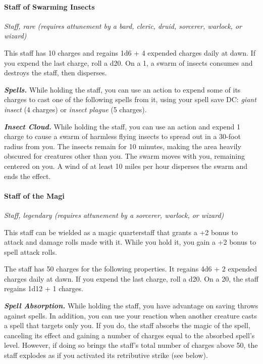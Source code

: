 \documentclass[
]{article}
\begin{document}
\hypertarget{staff-of-swarming-insects}{%
\paragraph{Staff of Swarming Insects}\label{staff-of-swarming-insects}}

\emph{Staff, rare (requires attunement by a bard, cleric, druid,
sorcerer, warlock, or wizard)}

This staff has 10 charges and regains 1d6 + 4 expended charges daily at
dawn. If you expend the last charge, roll a d20. On a 1, a swarm of
insects consumes and destroys the staff, then disperses.

\emph{\textbf{Spells.}} While holding the staff, you can use an action
to expend some of its charges to cast one of the following spells from
it, using your spell save DC: \emph{giant insect} (4 charges) or
\emph{insect plague} (5 charges).

\emph{\textbf{Insect Cloud.}} While holding the staff, you can use an
action and expend 1 charge to cause a swarm of harmless flying insects
to spread out in a 30-foot radius from you. The insects remain for 10
minutes, making the area heavily obscured for creatures other than you.
The swarm moves with you, remaining centered on you. A wind of at least
10 miles per hour disperses the swarm and ends the effect.

\hypertarget{staff-of-the-magi}{%
\paragraph{Staff of the Magi}\label{staff-of-the-magi}}

\emph{Staff, legendary (requires attunement by a sorcerer, warlock, or
wizard)}

This staff can be wielded as a magic quarterstaff that grants a +2 bonus
to attack and damage rolls made with it. While you hold it, you gain a
+2 bonus to spell attack rolls.

The staff has 50 charges for the following properties. It regains 4d6 +
2 expended charges daily at dawn. If you expend the last charge, roll a
d20. On a 20, the staff regains 1d12 + 1 charges.

\emph{\textbf{Spell Absorption.}} While holding the staff, you have
advantage on saving throws against spells. In addition, you can use your
reaction when another creature casts a spell that targets only you. If
you do, the staff absorbs the magic of the spell, canceling its effect
and gaining a number of charges equal to the absorbed spell's level.
However, if doing so brings the staff's total number of charges above
50, the staff explodes as if you activated its retributive strike (see
below).
\end{document}
